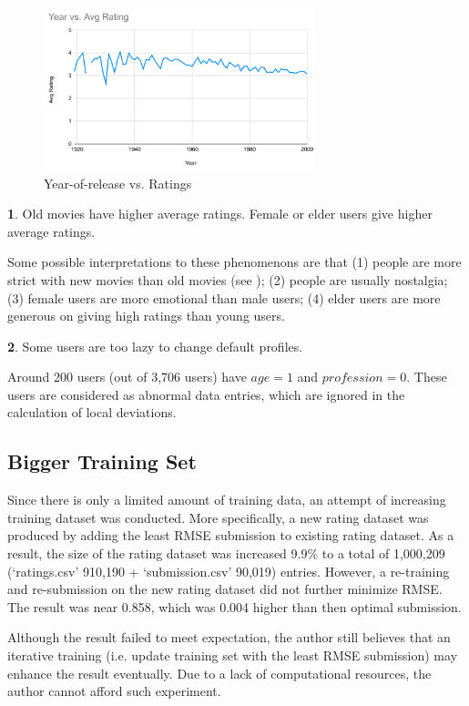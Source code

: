 \documentclass{ece}
\begin{document}
\begin{figure}[ht!] %
    \centering \includegraphics[width=0.7\textwidth]{year_vs_rating}
    \caption[Year-of-release vs. Ratings]{Year-of-release vs. Ratings}
    \label{fig:year_vs_rating}
\end{figure}

\textbf{1}. Old movies have higher average ratings. Female or elder users give higher average ratings.

Some possible interpretations to these phenomenons are that (1) people are more strict with new movies than old movies (see );
(2) people are usually nostalgia; (3) female users are more emotional than male users; (4) elder users are more generous on giving high ratings than young users.

\textbf{2}. Some users are too lazy to change default profiles.

Around 200 users (out of 3,706 users) have $age=1$ and $profession=0$.
These users are considered as abnormal data entries, which are ignored in the calculation of local deviations.

\subsection{Bigger Training Set}

Since there is only a limited amount of training data, an attempt of increasing training dataset was conducted.
More specifically, a new rating dataset was produced by adding the least RMSE submission to existing rating dataset.
As a result, the size of the rating dataset was increased 9.9\% to a total of 1,000,209 (`ratings.csv' 910,190 + `submission.csv' 90,019) entries.
However, a re-training and re-submission on the new rating dataset did not further minimize RMSE. The result was near 0.858, which was 0.004 higher than then optimal submission.

Although the result failed to meet expectation, the author still believes that an iterative training (i.e. update training set with the least RMSE submission) may enhance the result eventually.
Due to a lack of computational resources, the author cannot afford such experiment.
\end{document}

